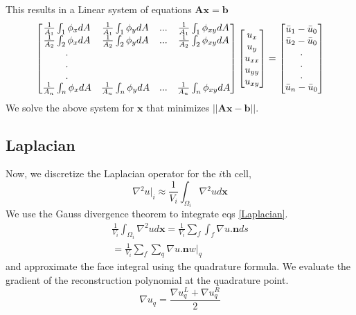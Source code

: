\documentclass[12pt]{article}
\begin{document}
This results in a Linear system of equations $\mathbf{A}\mathbf{x} = \mathbf{b}$
\begin{gather*}
   \begin{bmatrix}
   \frac{1}{A_{1}}\int_{1}\phi_{x}dA& \frac{1}{A_{1}}\int_{1}\phi_{y}dA&
   ... &
   \frac{1}{A_{1}}\int_{1}\phi_{xy}dA \\
   \frac{1}{A_{2}}\int_{2}\phi_{x}dA& \frac{1}{A_{2}}\int_{2}\phi_{y}dA&
   ... &
   \frac{1}{A_{2}}\int_{2}\phi_{xy}dA \\
   .\\
   .\\
   .\\
   \frac{1}{A_{n}}\int_{n}\phi_{x}dA& \frac{1}{A_{n}}\int_{n}\phi_{y}dA&
   ... &
   \frac{1}{A_{n}}\int_{n}\phi_{xy}dA \\
   \end{bmatrix}
   \begin{bmatrix}
   u_{x}\\
   u_{y}\\
   u_{xx}\\
   u_{yy}\\
   u_{xy}\\
   \end{bmatrix} =    \begin{bmatrix}
   \Bar{u}_{1} - \Bar{u}_{0}\\
   \Bar{u}_{2} - \Bar{u}_{0}\\
   .\\
   .\\
   .\\
   \Bar{u}_{n} - \Bar{u}_{0}\\
   \end{bmatrix}
\end{gather*}
We solve the above system for $\mathbf{x}$ that minimizes $||\mathbf{A}\mathbf{x} - \mathbf{b}||$.
\subsection*{Laplacian}
Now, we discretize the Laplacian operator for the $i$th cell,
\begin{equation}\label{Laplacian}
    \nabla{}^{2}u\Big|_{i} \approx \frac{1}{V_{i}}\int_{\Omega_{i}}\nabla{}^{2}ud\mathbf{x}
\end{equation}
We use the Gauss divergence theorem to integrate eqs \ref{Laplacian}.
\begin{align}
\frac{1}{V_{i}}\int_{\Omega_{i}}\nabla{}^{2}ud\mathbf{x} = \frac{1}{V_{i}}\sum_{f}\int_{f}\nabla{u}.\mathbf{n}ds\\
= \frac{1}{V_{i}}\sum_{f}\sum_{q}\nabla{u}.\mathbf{n}w\Big|_{q}
\end{align}
and approximate the face integral using the quadrature formula.
We evaluate the gradient of the reconstruction polynomial at the quadrature point.
\begin{equation}
    \nabla{u}_{q} = \frac{\nabla{u}_{q}^{L} + \nabla{u}_{q}^{R}}{2}
\end{equation}
\end{document}
